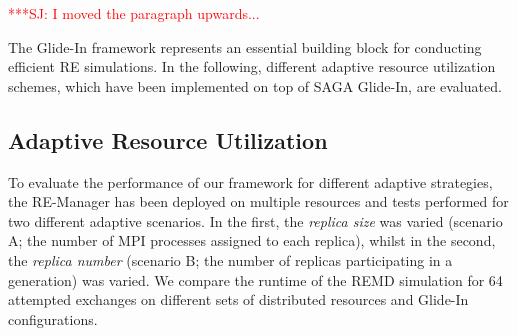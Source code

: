\documentclass{rspublic}
\newcommand{\jhanote}[1]{ {\textcolor{red} { ***SJ: #1 }}}
\newcommand{\jhanote}[1]{}
\begin{document}
\jhanote{I moved the paragraph upwards...}

The Glide-In framework represents an essential building block for
conducting efficient RE simulations. In the following,
different adaptive resource utilization schemes, which have been
implemented on top of SAGA Glide-In, are evaluated.

\subsection{Adaptive Resource Utilization}

To evaluate the performance of our framework for different adaptive
strategies, the RE-Manager has been deployed on multiple
resources %
and tests performed for two different adaptive scenarios.  In the
first, the \emph{replica size} was varied (scenario A; the number of
MPI processes assigned to each replica), whilst in the second, the
\emph{replica number} (scenario B; the number of replicas
participating in a generation) was varied. We compare the runtime of
the REMD simulation for 64 attempted exchanges on different sets of
distributed resources and Glide-In configurations.
                    
\end{document}
